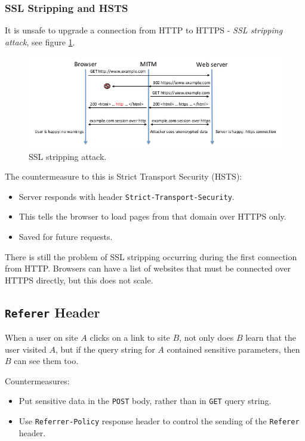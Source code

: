 \documentclass[11pt]{article}
\begin{document}
\subsubsection{SSL Stripping and HSTS}
It is unsafe to upgrade a connection from HTTP to HTTPS - \textit{SSL stripping attack}, see figure \ref{fig:strip}.

\begin{figure}[htb!]
  \centering
  \caption{SSL stripping attack.}
  \label{fig:strip}
  \includegraphics[scale=0.7]{sslstripping}
\end{figure}

The countermeasure to this is Strict Transport Security (HSTS):
\begin{itemize}
  \item Server responds with header \texttt{Strict-Transport-Security}.
  \item This tells the browser to load pages from that domain over HTTPS only.
  \item Saved for future requests.
\end{itemize}
There is still the problem of SSL stripping occurring during the first connection from HTTP.
Browsers can have a list of websites that must be connected over HTTPS directly, but this does not scale.

\subsection{\texttt{Referer} Header}
When a user on site $A$ clicks on a link to site $B$, not only does $B$ learn that the user visited $A$, but if the query string for $A$ contained sensitive parameters, then $B$ can see them too.

Countermeasures:
\begin{itemize}
  \item Put sensitive data in the \texttt{POST} body, rather than in \texttt{GET} query string.
  \item Use \texttt{Referrer-Policy} response header to control the sending of the \texttt{Referer} header.
\end{itemize}
\end{document}
